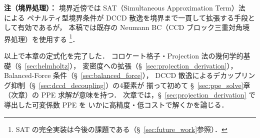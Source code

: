 \medskip
\noindent\textbf{注（境界処理）：}
境界近傍では SAT（Simultaneous Approximation Term）法~\cite{Carpenter1994} による
ペナルティ型境界条件が DCCD 散逸を境界まで一貫して拡張する手段として有効であるが，
本稿では既存の Neumann BC（CCD ブロック三重対角境界処理）を使用する%
\footnote{SAT の完全実装は今後の課題である（§~\ref{sec:future_work}参照）．}．

\medskip
以上で本章の定式化を完了した．
コロケート格子・Projection 法の幾何学的基礎（§~\ref{sec:helmholtz}），
変密度への拡張（§~\ref{sec:projection_derivation}），
Balanced-Force 条件（§~\ref{sec:balanced_force}），
DCCD 散逸によるデカップリング抑制（§~\ref{sec:dccd_decoupling}）の4要素が
揃って初めて §~\ref{sec:ppe_solve}章（次章）の PPE 求解が意味を持つ．
次章では，§~\ref{sec:projection_derivation} で導出した可変係数 PPE を
いかに高精度・低コストで解くかを論じる．
